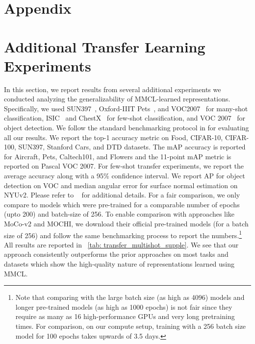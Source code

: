 \documentclass[letterpaper]{article} \usepackage{aaai22}  \usepackage{times}  \usepackage{helvet}  \usepackage{courier}  \usepackage[hyphens]{url}  \usepackage{graphicx} \urlstyle{rm} \def\UrlFont{\rm}  \usepackage{natbib}  \usepackage{caption} \DeclareCaptionStyle{ruled}{labelfont=normalfont,labelsep=colon,strut=off} \frenchspacing  \setlength{\pdfpagewidth}{8.5in}  \setlength{\pdfpageheight}{11in}
\begin{document}
\section{Appendix}


\section{Additional Transfer Learning Experiments}
In this section, we report results from several additional experiments we conducted analyzing the generalizability of MMCL-learned representations. Specifically, we used SUN397~\cite{xiao2010sun}, Oxford-IIIT Pets~\cite{parkhi2012cats}, and VOC2007~\cite{everingham2010pascal} for many-shot classification, ISIC~\cite{tschandl2018ham10000,codella2019skin} and ChestX~\cite{wang2017chestx} for few-shot classification, and VOC 2007~\cite{everingham2010pascal} for object detection. We follow the standard benchmarking protocol in \cite{Ericsson2021HowTransfer} for evaluating all our results. We report the top-1 accuracy metric on Food,
CIFAR-10, CIFAR-100, SUN397, Stanford Cars, and DTD datasets. The
mAP accuracy is reported for Aircraft,
Pets, Caltech101, and Flowers and the 11-point
mAP metric is reported on Pascal VOC 2007.  For few-shot transfer experiments, we report
the average accuracy along with a 95\% confidence interval. We report AP for object detection on VOC and median angular error for surface normal estimation on NYUv2. Please refer to ~\cite{Ericsson2021HowTransfer} for additional details. For a fair comparison, we only compare to models which were pre-trained for a comparable number of epochs (upto 200) and batch-size of 256. To enable comparison with approaches like MoCo-v2 and MOCHI, we download their official pre-trained models (for a batch size of 256) and follow the same benchmarking process to report the numbers.\footnote{Note that comparing with the large batch size (as high as 4096) models and longer pre-trained models (as high as 1000 epochs) is not fair since they require as many as 16 high-performance GPUs \cite{caron2020unsupervised} and very long pretraining times. For comparison, on our compute setup, training with a 256 batch size model for 100 epochs takes upwards of 3.5 days.} All results are reported in ~\ref{tab: transfer_multishot_supple}. We see that our approach consistently outperforms the prior approaches on most tasks and datasets which show the high-quality nature of representations learned using MMCL. 
\end{document}
